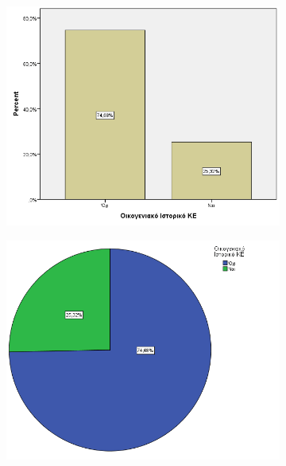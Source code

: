     \clearpage
\begin{figure}
 \centering
            \begin{subfigure}{0.7\textwidth}
     \centering
         \includegraphics[width=\textwidth]{images/9.png}
                      \end{subfigure}
                      
     \begin{subfigure}{0.6\textwidth}
     \centering
     \vspace{2cm}
         \includegraphics[width=\textwidth]{images/10.png}
                      \end{subfigure}
    \end{figure}
   
